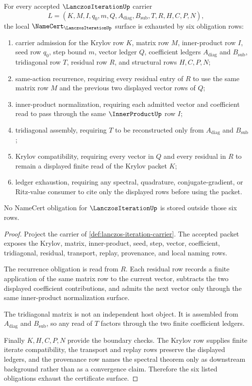 \begin{theorem}
\label{thm:lanczos-iteration-namecert-obligations}
For every accepted $\LanczosIterationUp$ carrier
$$
L=(K,M,I,q_0,m,Q,A_{\mathrm{diag}},B_{\mathrm{sub}},T,R,H,C,P,N),
$$
the local $\NameCert_{\LanczosIterationUp}$ surface is exhausted by six obligation rows:
\begin{enumerate}
\item carrier admission for the Krylov row $K$, matrix row $M$, inner-product row $I$, seed row $q_0$, step bound $m$, vector ledger $Q$, coefficient ledgers $A_{\mathrm{diag}}$ and $B_{\mathrm{sub}}$, tridiagonal row $T$, residual row $R$, and structural rows $H,C,P,N$;
\item same-action recurrence, requiring every residual entry of $R$ to use the same matrix row $M$ and the previous two displayed vector rows of $Q$;
\item inner-product normalization, requiring each admitted vector and coefficient read to pass through the same $\InnerProductUp$ row $I$;
\item tridiagonal assembly, requiring $T$ to be reconstructed only from $A_{\mathrm{diag}}$ and $B_{\mathrm{sub}}$;
\item Krylov compatibility, requiring every vector in $Q$ and every residual in $R$ to remain a displayed finite read of the Krylov packet $K$;
\item ledger exhaustion, requiring any spectral, quadrature, conjugate-gradient, or Ritz-value consumer to cite only the displayed rows before using the packet.
\end{enumerate}
No NameCert obligation for $\LanczosIterationUp$ is stored outside those six rows.
\end{theorem}
\begin{proof}
Project the carrier of \autoref{def:lanczos-iteration-carrier}. The accepted packet exposes the Krylov, matrix, inner-product, seed, step, vector, coefficient, tridiagonal, residual, transport, replay, provenance, and local naming rows.

The recurrence obligation is read from $R$. Each residual row records a finite application of the same matrix row to the current vector, subtracts the two displayed coefficient contributions, and admits the next vector only through the same inner-product normalization surface.

The tridiagonal matrix is not an independent host object. It is assembled from $A_{\mathrm{diag}}$ and $B_{\mathrm{sub}}$, so any read of $T$ factors through the two finite coefficient ledgers.

Finally $K,H,C,P,N$ provide the boundary checks. The Krylov row supplies finite iterate compatibility, the transport and replay rows preserve the displayed ledgers, and the provenance row names the spectral theorem only as downstream background rather than as a convergence claim. Therefore the six listed obligations exhaust the certificate surface.
\end{proof}

